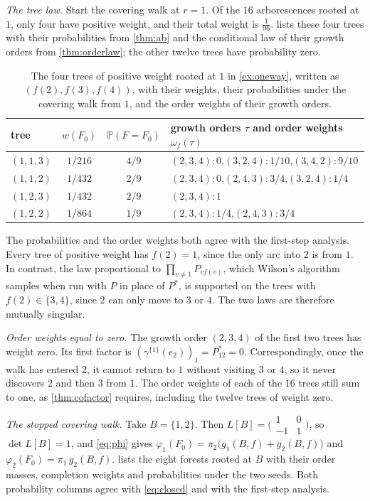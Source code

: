\documentclass[onefignum,onetabnum]{siamart250211}
\numberwithin{theorem}{section}
\numberwithin{equation}{section}
\newcommand{\pr}{\mathbb{P}}
\begin{document}
\begin{example}
\emph{The tree law.} Start the covering walk at $r=1$. Of the $16$
arborescences rooted at $1$, only four have positive weight, and their
total weight is $\tfrac1{96}$.  lists these four
trees with their probabilities from \cref{thm:ab} and the conditional
law of their growth orders from \cref{thm:orderlaw}; the other twelve
trees have probability zero.

\begin{table}[ht]
\caption{The four trees of positive weight rooted at $1$ in
\cref{ex:oneway}, written as $(f(2),f(3),f(4))$, with their weights,
their probabilities under the covering walk from $1$, and the order
weights of their growth orders.}\label{tab:oneway-trees}
\centering
\small
\begin{tabular}{@{}lccl@{}}
\toprule
tree & $w(F_0)$ & $\pr(F=F_0)$ & growth orders $\tau$ and order weights $\omega_f(\tau)$\\
\midrule
$(1,1,3)$ & $1/216$ & $4/9$ & $(2,3,4)\colon 0$,\quad $(3,2,4)\colon1/10$,\quad $(3,4,2)\colon9/10$\\
$(1,1,2)$ & $1/432$ & $2/9$ & $(2,3,4)\colon 0$,\quad $(2,4,3)\colon3/4$,\quad $(3,2,4)\colon1/4$\\
$(1,2,3)$ & $1/432$ & $2/9$ & $(2,3,4)\colon 1$\\
$(1,2,2)$ & $1/864$ & $1/9$ & $(2,3,4)\colon1/4$,\quad $(2,4,3)\colon3/4$\\
\bottomrule
\end{tabular}
\end{table}

The probabilities and the order weights both agree with the first-step
analysis. Every tree of positive weight has $f(2)=1$, since the only arc into
$2$ is from $1$. In contrast, the law proportional to
$\prod_{v\ne1}P_{vf(v)}$, which Wilson's algorithm samples when run
with $P$ in place of $P^{*}$, is supported on the
trees with $f(2)\in\{3,4\}$, since $2$ can only move to $3$ or $4$.
The two laws are therefore mutually singular.

\emph{Order weights equal to zero.} The growth order $(2,3,4)$ of the
first two trees has weight zero. Its first factor is
$(\gamma^{\{1\}}(e_2))_1=P^{*}_{12}=0$. Correspondingly, once the walk
has entered $2$, it cannot return to $1$ without visiting $3$ or $4$,
so it never discovers $2$ and then $3$ from $1$. The order weights of
each of the $16$ trees still sum to one, as \cref{thm:cofactor}
requires, including the twelve trees of weight zero.

\emph{The stopped covering walk.} Take $B=\{1,2\}$. Then
$L[B]=\big(\begin{smallmatrix}1&0\\-1&1\end{smallmatrix}\big)$, so
$\det L[B]=1$, and \eqref{eq:phi} gives
$\varphi_1(F_0)=\pi_2\big(g_1(B,f)+g_2(B,f)\big)$ and
$\varphi_2(F_0)=\pi_1\,g_2(B,f)$.  lists the
eight forests rooted at $B$ with their order masses, completion weights
and probabilities under the two seeds. Both probability columns agree
with \eqref{eq:closed} and with the first-step analysis.


\end{example}
\end{document}
